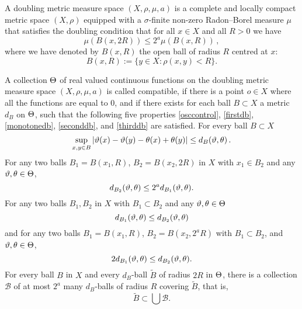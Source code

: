 A doubling metric measure space  $(X,\rho,\mu, a)$ is a complete
and locally compact metric space $(X,\rho)$
equipped with a $\sigma$-finite non-zero Radon--Borel measure $\mu$ that satisfies the doubling condition that for all $x\in X$ and all $R>0$ we have
\begin{equation}\label{doublingx}
    \mu(B(x,2R))\le 2^a\mu(B(x,R))\,,
\end{equation}
where we have denoted by $B(x,R)$ the open ball of radius $R$ centred at $x$:
\begin{equation}\label{eq-define-ball}
 B(x,R):=\{y\in X: \rho(x,y)<R\}. \end{equation}

A  collection ${\Theta}$ of real valued continuous functions on the doubling metric measure space $(X,\rho,\mu,a)$ is called compatible, if there is a point $o\in X$ where all the functions are equal to $0$, and if there exists for each ball $B \subset X$ a metric $d_B$ on ${\Theta}$, such that the following five properties \eqref{osccontrol}, \eqref{firstdb}, \eqref{monotonedb}, \eqref{seconddb}, and \eqref{thirddb} are satisfied. For every ball $B \subset X$
\begin{equation}\label{osccontrol}
    \sup_{x,y\in B}|{\vartheta}(x)-{{\vartheta}(y)}- {\theta}(x)+{{\theta}(y)}| \le d_{B}({\vartheta},{\theta})\,.
\end{equation}
For any two balls $B_1=B(x_1,R)$, $B_2= B(x_2,2R)$ in $X$ with $x_1\in B_2$  and any ${\vartheta},{\theta}\in {\Theta}$,
\begin{equation}\label{firstdb}
    d_{B_2}({\vartheta},{\theta})\le 2^a d_{B_1}({\vartheta},{\theta}) .
\end{equation}
For any two balls $B_1, B_2$ in $X$ with $B_1 \subset B_2$ and any ${\vartheta}, {\theta} \in {\Theta}$
\begin{equation}\label{monotonedb}
    d_{B_1}({\vartheta},{\theta}) \le d_{B_2}({\vartheta}, {\theta})
\end{equation}
and for any two balls
$B_1=B(x_1,R)$, $B_2= B(x_2,2^aR)$
with $B_1\subset B_2$, and ${\vartheta},{\theta}\in {\Theta}$,
\begin{equation}\label{seconddb}
    2d_{B_1}({\vartheta},{\theta})
\le d_{B_2}({\vartheta},{\theta}) .
\end{equation}
For every ball $B$ in $X$ and every $d_B$-ball $\tilde B$ of radius $2R$ in ${\Theta}$, there is a collection $\mathcal{B}$ of
at most $2^a$ many  $d_B$-balls of radius $R$ covering $\tilde B$, that is,
\begin{equation}\label{thirddb}
    \tilde B\subset \bigcup \mathcal{B}.
\end{equation}


